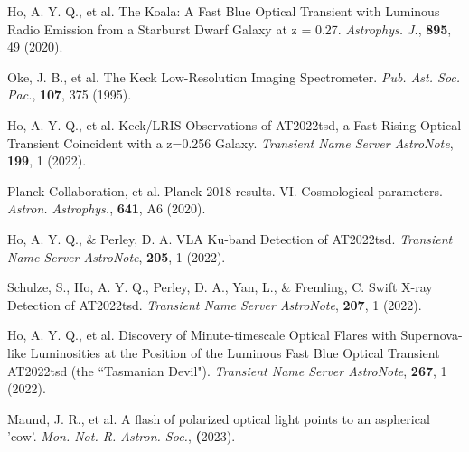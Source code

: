 \documentclass{nature_plusfigure}
\newcommand{\mn}{{Mon. Not. R. Astron. Soc.}}
\newcommand{\mnras}{\mn}
\newcommand{\apj}{{Astrophys. J.}}
\newcommand{\aap}{{Astron. Astrophys.}}
\newcommand{\pasp}{{Pub. Ast. Soc. Pac.}}
\newcommand{\at}{AT2022tsd}
\begin{document}
\begin{thebibliography}{100}
 Ho, A. Y. Q., et al. The Koala: A Fast Blue Optical Transient with Luminous Radio Emission from a Starburst Dwarf Galaxy at z = 0.27. \emph{\apj}, \textbf{895}, 49 (2020). 

 Oke, J. B., et al. The Keck Low-Resolution Imaging Spectrometer. \emph{\pasp}, \textbf{107}, 375 (1995). 

 Ho, A. Y. Q., et al. Keck/LRIS Observations of AT2022tsd, a Fast-Rising Optical Transient Coincident with a z=0.256 Galaxy. \emph{Transient Name Server AstroNote}, \textbf{199}, 1 (2022). 

 Planck Collaboration, et al. Planck 2018 results. VI. Cosmological parameters. \emph{\aap}, \textbf{641}, A6 (2020). 

 Ho, A. Y. Q., \& Perley, D. A. VLA Ku-band Detection of AT2022tsd. \emph{Transient Name Server AstroNote}, \textbf{205}, 1 (2022). 

 Schulze, S., Ho, A. Y. Q., Perley, D. A., Yan, L., \& Fremling, C. Swift X-ray Detection of AT2022tsd. \emph{Transient Name Server AstroNote}, \textbf{207}, 1 (2022). 

 Ho, A. Y. Q., et al. Discovery of Minute-timescale Optical Flares with Supernova-like Luminosities at the Position of the Luminous Fast Blue Optical Transient AT2022tsd (the ``Tasmanian Devil"). \emph{Transient Name Server AstroNote}, \textbf{267}, 1 (2022). 

 Maund, J. R., et al. A flash of polarized optical light points to an aspherical 'cow'. \emph{\mnras}, \textbf (2023). 


\end{thebibliography}


\end{document}
